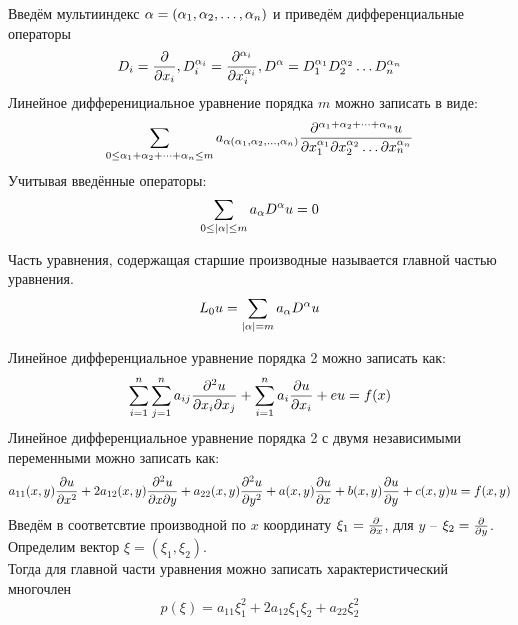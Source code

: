 \documentclass[../main.tex]{subfiles}
\begin{document}
Введём мультииндекс $\alpha = (\alpha_1,\alpha_2,\dots,\alpha_n)$ и приведём дифференциальные операторы
\[D_i=\frac{\partial  }{\partial x_i},D^{\alpha_i}_i=\frac{\partial ^{\alpha_i }}{\partial x_i^{\alpha_i}}, D^\alpha = D^{\alpha_1}_1 D^{\alpha_2}_2\dots D^{\alpha_n}_n\]
Линейное дифференициальное уравнение порядка $m$ можно записать в виде:
\[
	\sum_{0 \leq \alpha_1+\alpha_2+\dots+\alpha_n \leq m}
	a_{\alpha(\alpha_1, \alpha_2, \dots, \alpha_n)}
	\frac{\partial ^{\alpha_1+\alpha_2+\dots+\alpha_n}u}{\partial x_1^{\alpha_1} \partial{x_2^{\alpha_2}} \dots \partial{x_n^{\alpha_n}}}
\]
Учитывая введённые операторы:
\[
	\sum_{0 \leq |\alpha| \leq m}a_\alpha D^\alpha u = 0
\]

\begin{definition}
	Часть уравнения, содержащая старшие производные называется
	главной частью уравнения.
	\[L_0u = \sum_{|\alpha|=m} a_\alpha D^\alpha u\]
\end{definition}
Линейное дифференциальное уравнение порядка 2 можно записать как:
\[
	\sum^n_{i=1}\sum^n_{j=1}a_{ij}\frac{\partial ^2u}{\partial x_i \partial{x_j}} + 
	\sum^n_{i=1}a_i\frac{\partial u}{\partial x_i} + eu = f(x)
\]
Линейное дифференциальное уравнение порядка 2 с двумя 
независимыми переменными можно записать как:
\begin{equation}
	\label{eq:1.1} %
	a_{11}(x,y)\pderiv{u}{x^2} + 2a_{12}(x,y)\pderiv{^2u}{x \partial{y}} +
	a_{22}(x,y)\pderiv{^2u}{y^2} + a(x,y)\pderiv{u}{x} + b(x,y)\pderiv{u}{y} + c(x,y)u = f(x,y)
\end{equation}
Введём в соответсвтие производной по $x$ координату $\xi_1=\frac{\partial  }{\partial x}$,
для $y$ -- $\xi_2 = \frac{\partial  }{\partial y}$. Определим вектор $\xi=(\xi_1, \xi_2)$.\\
Тогда для главной части уравнения можно записать характеристический многочлен
\[
	p(\xi)=a_{11}\xi_1^2 + 2a_{12}\xi_1\xi_2 + a_{22}\xi_2^2
\]
\end{document}

